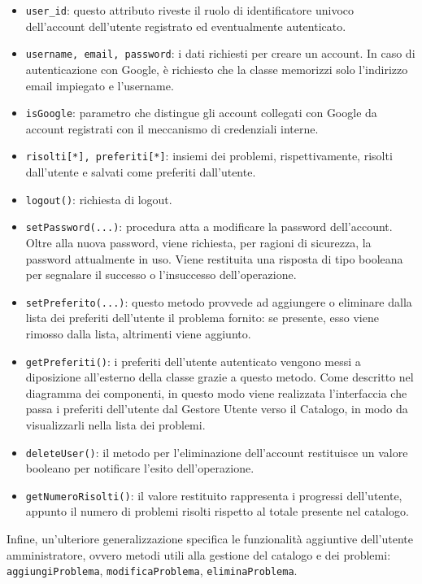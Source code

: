 \documentclass[11pt, a4paper]{article}
\theoremstyle{definition} %
\begin{document}
\begin{itemize}
    \item \texttt{user\_id}: questo attributo riveste il ruolo di identificatore
    univoco dell'account dell'utente registrato ed eventualmente autenticato.

    \item \texttt{username, email, password}: i dati richiesti per creare un
    account. In caso di autenticazione con Google, è richiesto che la classe
    memorizzi solo l'indirizzo email impiegato e l'username.

    \item \texttt{isGoogle}: parametro che distingue gli account collegati con
    Google da account registrati con il meccanismo di credenziali interne.

    \item \texttt{risolti[*], preferiti[*]}: insiemi dei problemi, rispettivamente,
    risolti dall'utente e salvati come preferiti dall'utente.

    \item \texttt{logout()}: richiesta di logout.
    
    \item \texttt{setPassword(...)}: procedura atta a modificare la password
    dell'account. Oltre alla nuova password, viene richiesta, per ragioni di
    sicurezza, la password attualmente in uso. Viene restituita una risposta
    di tipo booleana per segnalare il successo o l'insuccesso dell'operazione.

    \item \texttt{setPreferito(...)}: questo metodo provvede ad aggiungere o
    eliminare dalla lista dei preferiti dell'utente il problema fornito: se
    presente, esso viene rimosso dalla lista, altrimenti viene aggiunto.

    \item \texttt{getPreferiti()}: i preferiti dell'utente autenticato vengono
    messi a diposizione all'esterno della classe grazie a questo metodo.
    Come descritto nel diagramma dei componenti, in questo modo viene
    realizzata l'interfaccia che passa i preferiti dell'utente dal Gestore
    Utente verso il Catalogo, in modo da visualizzarli nella lista dei
    problemi.

    \item \texttt{deleteUser()}: il metodo per l'eliminazione dell'account
    restituisce un valore booleano per notificare l'esito dell'operazione.

    \item \texttt{getNumeroRisolti()}: il valore restituito rappresenta i
    progressi dell'utente, appunto il numero di problemi risolti rispetto
    al totale presente nel catalogo.
\end{itemize}
Infine, un'ulteriore generalizzazione specifica le funzionalità aggiuntive
dell'utente amministratore, ovvero metodi utili alla gestione del catalogo
e dei problemi:
\texttt{aggiungiProblema}, \texttt{modificaProblema}, \texttt{eliminaProblema}.
\end{document}

